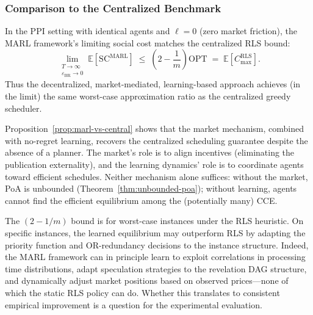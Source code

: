 \subsubsection{Comparison to the Centralized Benchmark}

\begin{proposition}\label{prop:marl-vs-central}
In the PPI setting with identical agents and $\ell = 0$ (zero market friction), the MARL framework's limiting social cost matches the centralized RLS bound:
\[
\lim_{\substack{T\to\infty\\\varepsilon_{\mathrm{BR}}\to 0}} \mathbb{E}[\mathrm{SC}^{\mathrm{MARL}}] \;\le\; \left(2-\frac{1}{m}\right)\mathrm{OPT} \;=\; \mathbb{E}[C_{\max}^{\mathrm{RLS}}].
\]
Thus the decentralized, market-mediated, learning-based approach achieves (in the limit) the same worst-case approximation ratio as the centralized greedy scheduler.
\end{proposition}

\begin{remark}[Interpretation]
Proposition~\ref{prop:marl-vs-central} shows that the market mechanism, combined with no-regret learning, recovers the centralized scheduling guarantee despite the absence of a planner. The market's role is to align incentives (eliminating the publication externality), and the learning dynamics' role is to coordinate agents toward efficient schedules. Neither mechanism alone suffices: without the market, PoA is unbounded (Theorem~\ref{thm:unbounded-poa}); without learning, agents cannot find the efficient equilibrium among the (potentially many) CCE.
\end{remark}

\begin{remark}
The $(2-1/m)$ bound is for worst-case instances under the RLS heuristic. On specific instances, the learned equilibrium may outperform RLS by adapting the priority function and OR-redundancy decisions to the instance structure. Indeed, the MARL framework can in principle learn to exploit correlations in processing time distributions, adapt speculation strategies to the revelation DAG structure, and dynamically adjust market positions based on observed prices---none of which the static RLS policy can do. Whether this translates to consistent empirical improvement is a question for the experimental evaluation.
\end{remark}



